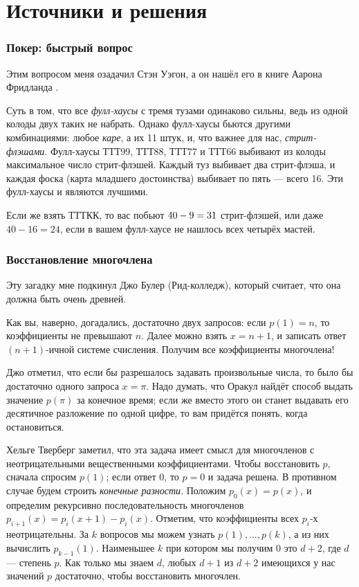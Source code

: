 \section*{Источники и решения}

\subsubsection*{Покер: быстрый вопрос}

Этим вопросом меня озадачил Стэн Уэгон, а он нашёл его в книге Аарона Фридланда \cite{18}.

Суть в том, что все \emph{фулл-хаусы} с тремя тузами одинаково сильны, ведь из одной колоды двух таких не набрать.
Однако фулл-хаусы бьются другими комбинациями: любое \emph{каре}, а их 11 штук, и, что важнее для нас, \emph{стрит-флэшами}.
Фулл-хаусы ТТТ99, ТТТ88, ТТТ77 и ТТТ66 выбивают из колоды максимальное число стрит-флэшей.
Каждый туз выбивает два стрит-флэша, и каждая фоска (карта младшего достоинства) выбивает по пять --- всего 16.
Эти фулл-хаусы и являются лучшими.

Если же взять ТТТКК, то вас побьют $40 - 9 \z= 31$ стрит-флэшей, или даже $40 - 16 = 24$, если в вашем фулл-хаусе не нашлось всех четырёх мастей.

\subsubsection*{Восстановление многочлена}

Эту загадку мне подкинул Джо Булер (Рид-колледж), который считает, что она должна быть очень древней.

Как вы, наверно, догадались, достаточно двух запросов:
если $p(1)=n$, то коэффициенты не превышают $n$.
Далее можно взять $x = n + 1$, и записать ответ $(n + 1)$-ичной системе счисления.
Получим все коэффициенты многочлена!

Джо отметил, что если бы разрешалось задавать произвольные числа, то было бы достаточно одного запроса $x = \pi$.
Надо думать, что Оракул найдёт способ выдать значение $p(\pi)$ за конечное время;
если же вместо этого он станет выдавать его десятичное разложение по одной цифре,
то вам придётся понять, когда остановиться.

Хельге Тверберг заметил, что эта задача имеет смысл для многочленов с неотрицательными вещественными коэффициентами.
Чтобы восстановить $p$, сначала спросим $p(1)$; если ответ $0$, то $p = 0$ и задача решена.
В противном случае будем строить \emph{конечные разности}.
Положим $p_0(x) = p(x)$, и определим рекурсивно последовательность многочленов $p_{i+1}(x) = p_i (x+1) - p_i(x)$.
Отметим, что коэффициенты всех $p_i$-х неотрицательны.
За $k$ вопросов мы можем узнать $p(1),\dots,p(k)$,
а из них вычислить $p_{k-1}(1)$.
Наименьшее $k$ при котором мы получим $0$ это $d+2$, где $d$ --- степень $p$.
Как только мы знаем $d$, любых $d+1$ из $d+2$ имеющихся у нас значений $p$ достаточно, чтобы восстановить многочлен.

